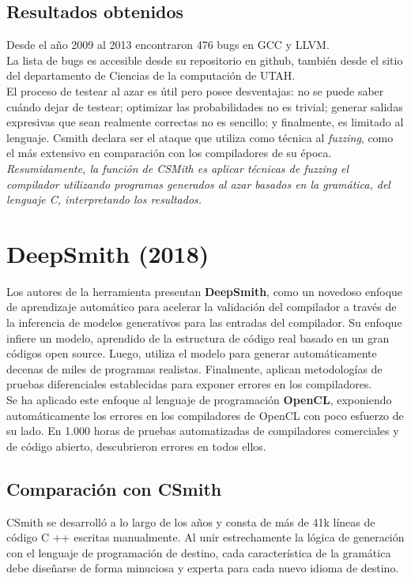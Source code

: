 \subsection{Resultados obtenidos}
Desde el año 2009 al 2013 encontraron 476 bugs en GCC\cite{gccbuglistcsmith} y LLVM\cite{llvmbuglistcsmith}.\\

La lista de bugs es accesible desde su repositorio\cite{bugsreportedcsmith} en github, también desde el sitio del departamento de Ciencias de la computación de UTAH.\\

El proceso de testear al azar es útil pero posee desventajas: no se puede saber cuándo dejar de testear; optimizar las probabilidades no es trivial; generar salidas expresivas que sean realmente correctas no es sencillo; y finalmente, es limitado al lenguaje. Csmith declara ser el ataque que utiliza como técnica al \textit{fuzzing}, como el más extensivo en comparación con los compiladores de su época.\\

\textit{Resumidamente, la función de CSMith es aplicar técnicas de fuzzing el compilador utilizando programas generados al azar basados en la gramática, del lenguaje C, interpretando los resultados.}

\section{DeepSmith (2018)}
\label{ref:deepsmith}
Los autores de la herramienta presentan \textbf{DeepSmith}\cite{Cummins:2018:CFT:3213846.3213848}, como un novedoso enfoque de aprendizaje automático para acelerar la validación del compilador a través de la inferencia de modelos generativos para las entradas del compilador. Su enfoque infiere un modelo, aprendido de la estructura de código real basado en un gran códigos open source. Luego, utiliza el modelo para generar automáticamente decenas de miles de programas realistas. Finalmente, aplican metodologías de pruebas diferenciales establecidas para exponer errores en los compiladores.\\

Se ha aplicado este enfoque al lenguaje de programación \textbf{OpenCL}, exponiendo automáticamente los errores en los compiladores de OpenCL con poco esfuerzo de su lado. En 1.000 horas de pruebas automatizadas de compiladores comerciales y de código abierto, descubrieron errores en todos ellos.

\subsection{Comparación con CSmith}
CSmith se desarrolló a lo largo de los años y consta de más de 41k líneas de código C ++ escritas manualmente. Al unir estrechamente la lógica de generación con el lenguaje de programación de destino, cada característica de la gramática debe diseñarse de forma minuciosa y experta para cada nuevo idioma de destino.\\

